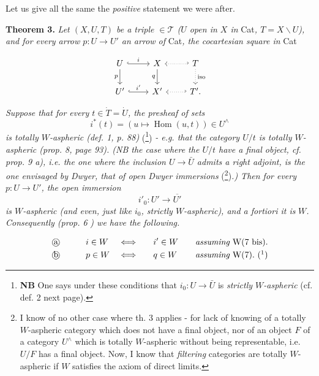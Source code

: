 Let us give all the same the \textit{positive} statement we were after. %

\textbf{Theorem 3.} \textit{Let $(X,U,T)$ be a triple $\in\mathcal{T}$ ($U$ open in $X$ in} Cat\textit{, $T=X\backslash U$), and for every arrow $p:U\longrightarrow U'$ an arrow of} Cat\textit{, the cocartesian square in} Cat

\[
\begin{tikzcd}
U \arrow[r, hook, "i"] \arrow[d, "p"'] & X \arrow[d, "q"'] & T \arrow[l, dotted, hook'] \arrow[d, dotted, "\text{iso}"] \\
U' \arrow[r, hook, "i'"] & X' & T'. \arrow[l, dotted, hook']
\end{tikzcd}
\]



\textit{Suppose that for every $t\in\dot{T}=\dot{U}$, the presheaf of sets}
\[ i^*(t)=(u\longmapsto\operatorname{Hom}(u,t))\in U^\wedge \]
\textit{is totally $W$-aspheric (def. 1, p. 88)} (\footnote{\textbf{NB} One says under these conditions that $i_0:U\longrightarrow\bar{U}$ is \textit{strictly $W$-aspheric} (cf. def. 2 next page).}) \textit{- e.g. that the category $U/t$ is totally $W$-aspheric (prop. 8, page 93). (NB the case where the $U/t$ have a final object, cf. prop. 9 a), i.e. the one where the inclusion $U\longrightarrow\bar{U}$ admits a right adjoint, is the one envisaged by Dwyer, that of open Dwyer immersions} (\footnote{I know of no other case where th. 3 applies - for lack of knowing of a totally $W$-aspheric category which does not have a final object, nor of an object $F$ of a category $U^\wedge$ which is totally $W$-aspheric without being representable, i.e. $U/F$ has a final object. Now, I know that \textit{filtering} categories are totally $W$-aspheric if $W$ satisfies the axiom of direct limits.})\textit{.) Then for every $p:U\longrightarrow U'$, the open immersion}
\[ i'_0:U'\longrightarrow\overline{U'} \]
\textit{is $W$-aspheric (and even, just like $i_0$, strictly $W$-aspheric), and a fortiori it is} \textit{$W$. Consequently (prop. 6} \textit{) we have the following.}

\[
\begin{aligned}
&\text{\textcircled{a}}\qquad && i\in W && \Longleftrightarrow\quad && i'\in W\quad && \textit{assuming } \mathrm{W}(7\text{ bis}).\\
&\text{\textcircled{b}}\qquad && p\in W && \Longleftrightarrow\quad && q\in W\quad && \textit{assuming } \mathrm{W}(7).\ (\footnotemark)
\end{aligned}
\]

